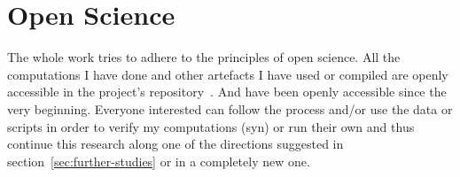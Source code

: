\begin{comment}
"When your analysis indicates, use theoretical codes to help you clarify and
sharpen your analysis but avoid imposing a forced framework on it with them."
"interrogate yourself about whether these theoretical codes interpret all the data" (p.66)

"each preconceived idea should earn
its way into your analysis-including your own ideas from previous studies"(p.68)

TODO: Check against my analysis:
"Be careful about applying a language of intention,
motivation, or strategies unless the data support your assertions. You cannot assume
what is in someone' s mind-particularly if he or she does not tell you."(p.68)

"Take an examined stance about whose point of view your codes reflect,"(p.69)

Grounded Theory~\cite{Charmaz2006}
Chapter 2:
"
* How was the text produced? By whom?
* What is the ostensible purpose of the text? Might the text serve other unstated or assumed purposes? Which ones?
* How does the text represent what its author(s) assumed to exist? Which meanings are embedded within it? How do those meanings reflect a particular social, historica, and perhaps organizational context?
* What is the structure of the text?
* How does its structure shape what is said? Which categories can you discern in its structure? What can you glean from these categories? Do the categories change in sequential texts over time? How so?
* Which contextual meanings does the text imply?
* How does its content construct images of reality?
* Which realities does the text claim to represent? How does it represent them?
* What, if any, unintended information and meanings might you see in the text?
* How is language used?
* Which rules govern the constructuion of the text? How can you discern them in the narrative? How do these rules reflect both tacit assumptions and explicit meanings? How might they be related to other data on the same topic?
* When and how do telling points emerge in the text?
* What kinds of comparisons can you make between texts? Between different texts on the same topic? Similar texts at different times such as organizational annual reports? Between different authors who address the same questions?
* Who benefits from the text? Why?
"
\end{comment}

\section{Open Science}

The whole work tries to adhere to the principles of open science. %
All the computations I have done and other artefacts I have used or compiled are openly accessible in the project's repository~\cite{github}.
And have been openly accessible since the very beginning.
Everyone interested can follow the process and/or use the data or scripts in order to verify my computations (syn) or run their own and thus continue this research along one of the directions suggested in section~\ref{sec:further-studies} or in a completely new one.

